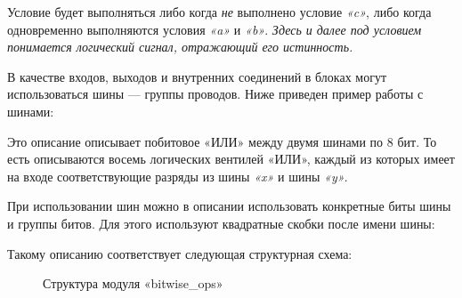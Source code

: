 \documentclass[a5paper, DIV=14, headings=openany, twoside=true,fontsize=10pt, titlepage]{scrreprt}
\newcommand{\quotes}[1]{«#1»}
\newcommand{\qeng}[1]{\quotes{\foreignlanguage{english}{#1}}}
\begin{document}
\par{Условие будет выполняться либо когда \emph{не} выполнено условие \emph{\qeng{c}}, либо когда одновременно выполняются условия \emph{\qeng{a}} и \emph{\qeng{b}}. \emph{Здесь и далее под условием понимается логический сигнал, отражающий его истинность.}}
\par{В качестве входов, выходов и внутренних соединений в блоках могут использоваться шины — группы проводов. Ниже приведен пример работы с шинами:}

\begin{minipage}{\linewidth}

\end{minipage}

\par{Это описание описывает побитовое \quotes{ИЛИ} между двумя шинами по 8 бит. То есть описываются восемь логических вентилей \quotes{ИЛИ}, каждый из которых имеет на входе соответствующие разряды из шины \emph{\qeng{x}} и шины \emph{\qeng{y}}.}

\par{При использовании шин можно в описании использовать конкретные биты шины и группы битов. Для этого используют квадратные скобки после имени шины:}

\begin{minipage}{\linewidth}

\end{minipage}

\begin{minipage}{\textwidth}
\par{Такому описанию соответствует следующая структурная схема:}

\begin{figure}[H]
\centering
\def\svgwidth{\columnwidth}

\caption{Структура модуля \qeng{bitwise\_ops}}
\end{figure}

\end{minipage}
\end{document}
